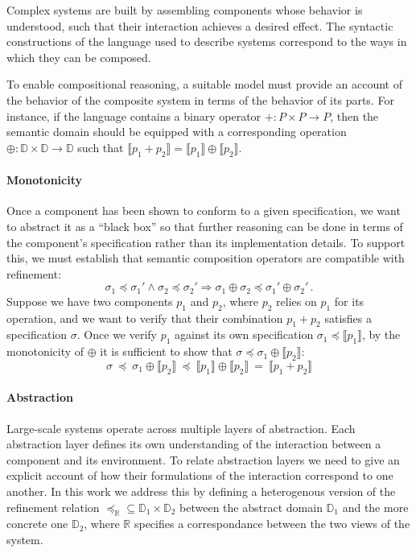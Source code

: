 \documentclass[draft,11pt]{report}
\newcommand{\refby}{\preceq}     %
\begin{document}
Complex systems are built by assembling components
whose behavior is understood,
such that their interaction achieves a desired effect.
The syntactic constructions of
the language used to describe systems
correspond to the ways in which they can be composed.

To enable compositional reasoning,
a suitable model must provide an account of
the behavior of the composite system
in terms of the behavior of its parts.
For instance,
if the language contains a binary operator
${+} : P \times P \rightarrow P$,
then the semantic domain should be equipped with
a corresponding operation
${\oplus} : \mathbb{D} \times \mathbb{D} \rightarrow \mathbb{D}$
such that
$\llbracket p_1 + p_2 \rrbracket =
 \llbracket p_1 \rrbracket \oplus \llbracket p_2 \rrbracket$.


\paragraph{Monotonicity} %

Once a component has been shown to conform to a given specification,
we want to abstract it as a ``black box''
so that further reasoning can be done in terms of
the component's specification rather than its implementation details.
To support this,
we must establish that semantic composition operators
are compatible with refinement:
\[ \sigma_1 \refby \sigma_1' \wedge
   \sigma_2 \refby \sigma_2' \Rightarrow
   \sigma_1 \oplus \sigma_2 \refby \sigma_1' \oplus \sigma_2' \,. \]
Suppose we have two components $p_1$ and $p_2$,
where $p_2$ relies on $p_1$ for its operation,
and we want to verify that their combination $p_1 + p_2$
satisfies a specification $\sigma$.
Once we verify $p_1$ against its own specification
$\sigma_1 \refby \llbracket p_1 \rrbracket$,
by the monotonicity of ${\oplus}$ it is sufficient to show that
$\sigma \refby \sigma_1 \oplus \llbracket p_2 \rrbracket$:
\[
   \sigma \:\refby\:
   \sigma_1 \oplus \llbracket p_2 \rrbracket \:\refby\:
   \llbracket p_1 \rrbracket \oplus \llbracket p_2 \rrbracket \:=\:
   \llbracket p_1 + p_2 \rrbracket
\]


\paragraph{Abstraction} %

Large-scale systems operate across multiple layers of abstraction.
Each abstraction layer defines its own understanding of the interaction
between a component and its environment.
To relate abstraction layers we need to give
an explicit account of how their formulations of the interaction
correspond to one another.
In this work we address this by defining a heterogenous version
of the refinement relation
${\refby_\mathbb{R}} \subseteq
 \mathbb{D}_1 \times \mathbb{D}_2$ between
the abstract domain $\mathbb{D}_1$ and
the more concrete one $\mathbb{D}_2$, where
$\mathbb{R}$ specifies a correspondance between
the two views of the system.
\end{document}
